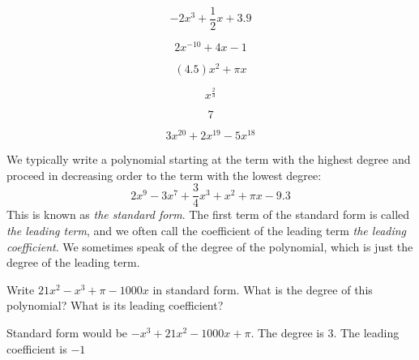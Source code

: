 \begin{Answer}[ref=findpolynomials]
\begin{multicols}{3}
  \begin{equation*}
    \boxed{-2 x^3 + \frac{1}{2}x + 3.9}
  \end{equation*}

  \begin{equation*}
    2 x^{-10} + 4x - 1
  \end{equation*}

  \begin{equation*}
    \boxed{(4.5)x^2 + \pi x}
  \end{equation*}

  \begin{equation*}
    x^{\frac{2}{3}}
  \end{equation*}

  \begin{equation*}
   \boxed{7}
  \end{equation*}

  \begin{equation*}
    \boxed{3x^{20} + 2x^{19} -5 x^{18}}
  \end{equation*}
\end{multicols}

\end{Answer}

We typically write a polynomial starting at the term with the highest
degree and proceed in decreasing order to the term with the lowest
degree:
\begin{equation*}
2 x^9 - 3x^7 + \frac{3}{4}x^3 + x^2 + \pi x -9.3
\end{equation*}
This is known as \emph{the standard form}.  The first term of the
standard form is called \emph{the leading term}, and we often call the
coefficient of the leading term \emph{the leading coefficient}.  We
sometimes speak of the degree of the polynomial, which is just the
degree of the leading term.

\begin{Exercise}[title={Standard of a Polynomial}, label=polynomialstandardform]
  Write $21x^2 - x^3 + \pi - 1000x$ in standard form. What is the degree of this polynomial? What is its leading coefficient?
\end{Exercise}
\begin{Answer}[ref=polynomialstandardform]
  Standard form would be $-x^3 + 21x^2 - 1000x + \pi$. The degree is 3. The leading coefficient is $-1$
\end{Answer}

